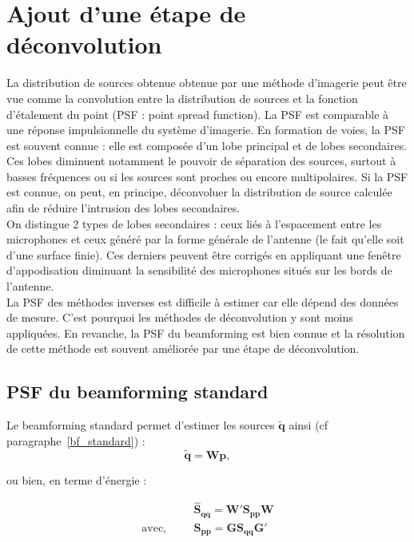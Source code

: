 \section{Ajout d'une étape de déconvolution\label{deconvolution}}

La distribution de sources obtenue obtenue par une méthode d'imagerie peut être vue comme la convolution entre la distribution de sources et la fonction d'étalement du point (PSF : point spread function). La PSF est comparable à une réponse impulsionnelle du système d'imagerie. En formation de voies, la PSF est souvent connue \citep{Bahr2011a}: elle est composée d'un lobe principal et de lobes secondaires. \\

Ces lobes diminuent notamment le pouvoir de séparation des sources, surtout à basses fréquences ou si les sources sont proches ou encore multipolaires. Si la PSF est connue, on peut, en principe, déconvoluer la distribution  de source calculée afin de réduire l'intrusion des lobes secondaires.\\

On distingue 2 types de lobes secondaires : ceux liés à l'espacement entre les microphones et ceux généré par la forme générale de l'antenne (le fait qu'elle soit d'une surface finie). Ces derniers peuvent être corrigés en appliquant une fenêtre d'appodisation diminuant la sensibilité des microphones situés sur les bords de l'antenne.\\


La PSF des méthodes inverses est difficile à estimer car elle dépend des données de mesure. C'est pourquoi les méthodes de déconvolution y sont moins appliquées. En revanche, la PSF du beamforming est bien connue et la résolution de cette méthode est souvent améliorée par une étape de déconvolution.\\

\subsection{PSF du beamforming standard}

Le beamforming standard permet d'estimer les sources $\bm{\tilde{q}}$ ainsi (cf paragraphe~\ref{bf_standard}) : 
\begin{equation}
	\bm{\tilde{q}} = \bm{W}\bm{p},
\end{equation}

ou bien, en terme d'énergie : 

\begin{align}\label{bf_psf}
	~ & \bm{\hat{S}_{qq}} = \bm{W}' \bm{S_{pp}} \bm{W}  \\
	\text{avec, ~~~~} & \bm{S_{pp}} = \bm{G S_{qq}G}'
\end{align}

